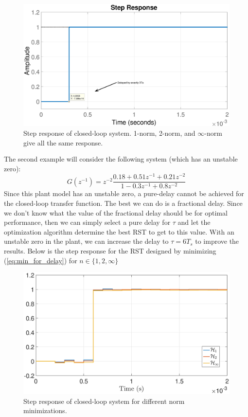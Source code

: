 \documentclass[12pt]{article}
\begin{document}
\begin{figure}[H]
\centering
\includegraphics[width=\columnwidth]{pics/stable_zero_resp}
\caption{Step response of closed-loop system. 1-norm, 2-norm, and $\infty$-norm give all the same response.}
\label{fig:stable_zero_resp}
\end{figure} 

The second example will consider the following system (which has an unstable zero):
\begin{equation}
G(z^{-1}) = z^{-2} \frac{0.18  + 0.51 z^{-1} + 0.21 z^{-2}}{ 1 - 0.3 z^{-1} + 0.8 z^{-2}}
\end{equation} 
Since this plant model has an unstable zero, a pure-delay cannot be achieved for the closed-loop transfer function. The best we can do is a fractional delay. Since we don't know what the value of the fractional delay should be for optimal performance, then we can simply select a pure delay for $\tau$ and let the optimization algorithm determine the best RST to get to this value. With an unstable zero in the plant, we can increase the delay to $\tau = 6T_s$ to improve the results. Below is the step response for the RST designed by minimizing (\ref{eq:min_for_delay}) for $n \in \{1,2,\infty \}$

\begin{figure}[H]
\centering
\includegraphics[width=\columnwidth]{pics/unstable_zero_resp}
\caption{Step response of closed-loop system for different norm minimizations.}
\label{fig:unstable_zero_resp}
\end{figure} 
\end{document}
